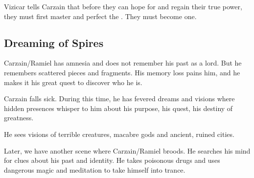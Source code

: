 Vizicar tells Carzain that before they can hope for  and regain their true power, they must first master and perfect the \Kenosis. 
They must become one. 









\subsection{Dreaming of \Cuezcan{} Spires}
Carzain/Ramiel has amnesia and does not remember his past as a \resphan{} lord. But he remembers scattered pieces and fragments. His memory loss pains him, and he makes it his great quest to discover who he is. 

Carzain falls sick. During this time, he has fevered dreams and visions where hidden presences whisper to him about his purpose, his quest, his destiny of greatness. 

He sees visions of terrible creatures, macabre gods and ancient, ruined cities. 

Later, we have another scene where Carzain/Ramiel broods. He searches his mind for clues about his past and identity. He takes poisonous drugs and uses dangerous magic and meditation to take himself into trance.

